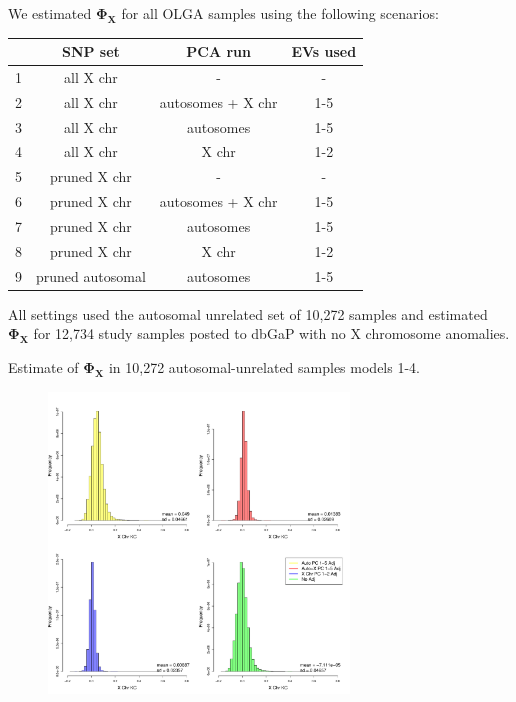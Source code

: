 \documentclass{beamer}
\begin{document}
\begin{frame}
We estimated $\mathbf{\Phi_X}$ for all OLGA samples using the following scenarios:
\begin{table}[ht]
\centering
\begin{tabular}{r|ccc}
  \hline
   &SNP set& PCA run & EVs used \\ 
  \hline
1 &all X chr & - & - \\
2 & all X chr & autosomes + X chr & 1-5 \\
3 & all X chr & autosomes & 1-5\\
4 & all X chr & X chr & 1-2\\ \hline
5 & pruned X chr & - & - \\
6 & pruned X chr & autosomes + X chr & 1-5\\
7 & pruned X chr & autosomes & 1-5\\
8 & pruned X chr & X chr & 1-2 \\
   \hline
9 & pruned autosomal & autosomes & 1-5\\
\end{tabular}
\end{table}
All settings used the autosomal unrelated set of 10,272 samples and estimated $\mathbf{\Phi_X}$ for 12,734 study samples posted to dbGaP with no X chromosome anomalies.
\end{frame}

\begin{frame}
\footnotesize Estimate of $\mathbf{\Phi_X}$ in 10,272 autosomal-unrelated samples models 1-4.
\centering
\begin{figure}
\includegraphics[height=8cm]{../hist_allXchrKC.pdf}
\end{figure}
\end{frame}
\end{document}

